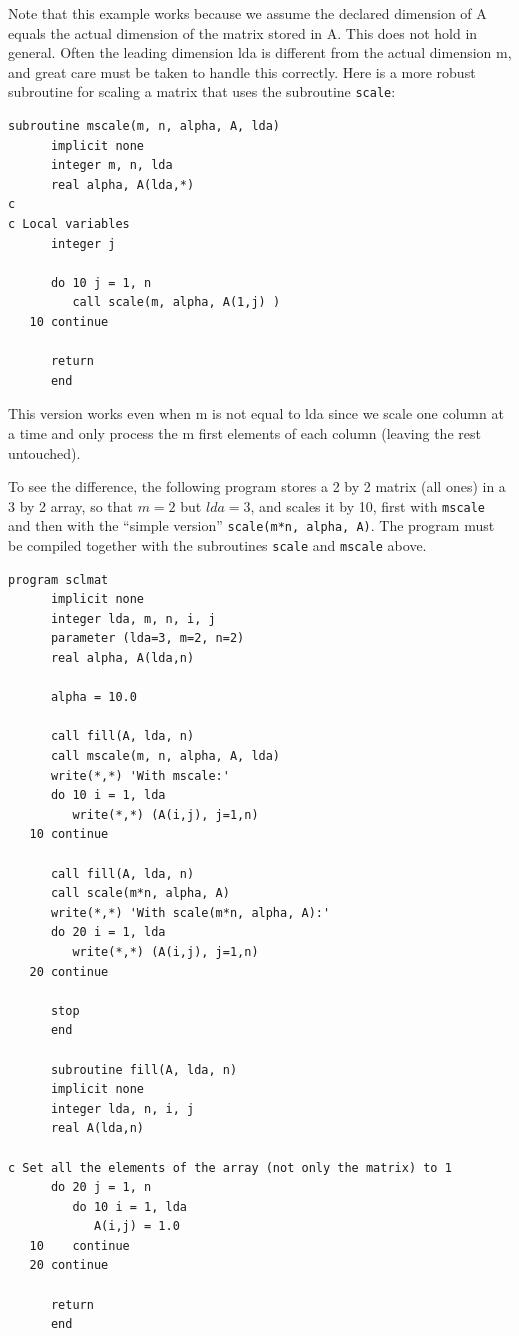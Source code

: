 Note that this example works because we assume the declared dimension of A equals the actual dimension of the matrix stored in A. This does not hold in general. Often the leading dimension lda is different from the actual dimension m, and great care must be taken to handle this correctly. Here is a more robust subroutine for scaling a matrix that uses the subroutine \texttt{scale}:

\begin{lstlisting}[style=fortran77]
      subroutine mscale(m, n, alpha, A, lda)
      implicit none
      integer m, n, lda
      real alpha, A(lda,*)
c
c Local variables
      integer j

      do 10 j = 1, n
         call scale(m, alpha, A(1,j) )
   10 continue

      return
      end
\end{lstlisting}

This version works even when m is not equal to lda since we scale one column at a time and only process the m first elements of each column (leaving the rest untouched).

To see the difference, the following program stores a 2 by 2 matrix (all ones) in a 3 by 2 array, so that $m = 2$ but $lda = 3$, and scales it by 10, first with \texttt{mscale} and then with the ``simple version'' \texttt{scale(m*n, alpha, A)}. The program must be compiled together with the subroutines \texttt{scale} and \texttt{mscale} above.

\begin{lstlisting}[style=fortran77]
      program sclmat
      implicit none
      integer lda, m, n, i, j
      parameter (lda=3, m=2, n=2)
      real alpha, A(lda,n)

      alpha = 10.0

      call fill(A, lda, n)
      call mscale(m, n, alpha, A, lda)
      write(*,*) 'With mscale:'
      do 10 i = 1, lda
         write(*,*) (A(i,j), j=1,n)
   10 continue

      call fill(A, lda, n)
      call scale(m*n, alpha, A)
      write(*,*) 'With scale(m*n, alpha, A):'
      do 20 i = 1, lda
         write(*,*) (A(i,j), j=1,n)
   20 continue

      stop
      end

      subroutine fill(A, lda, n)
      implicit none
      integer lda, n, i, j
      real A(lda,n)

c Set all the elements of the array (not only the matrix) to 1
      do 20 j = 1, n
         do 10 i = 1, lda
            A(i,j) = 1.0
   10    continue
   20 continue

      return
      end
\end{lstlisting}

